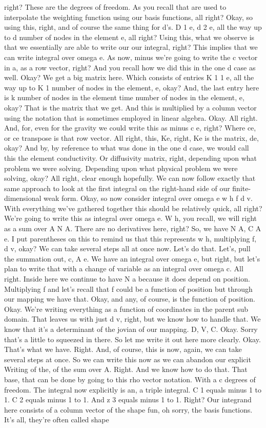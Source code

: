 \documentclass[10pt]{article}
\begin{document}
right? These are the degrees of freedom. As you recall that are used to interpolate the weighting function using our basis functions, all right? Okay, so using this, right, and of course the same thing for d's. D 1 e, d 2 e, all the way up to d number of nodes in the element e, all right? Using this, what we observe is that we essentially are able to write our our integral, right? This implies that we can write integral over omega e. As now, minus we're going to write the c vector in a, as a row vector, right? And you recall how we did this in the one d case as well. Okay? We get a big matrix here. Which consists of entries K 1 1 e, all the way up to K 1 number of nodes in the element, e, okay? And, the last entry here is k number of nodes in the element time number of nodes in the element, e, okay? That is the matrix that we get. And this is multiplied by a column vector using the notation that is sometimes employed in linear algebra. Okay. All right. And, for, even for the gravity we could write this as minus c e, right? Where ce, or ce transpose is that row vector. All right, this, Ke, right, Ke is the matrix, de, okay? And by, by reference to what was done in the one d case, we would call this the element conductivity. Or diffusivity matrix, right, depending upon what problem we were solving. Depending upon what physical problem we were solving, okay? All right, clear enough hopefully. We can now follow exactly that same approach to look at the first integral on the right-hand side of our finite-dimensional weak form. Okay, so now consider integral over omega e w h f d v. With everything we've gathered together this should be relatively quick, all right? We're going to write this as integral over omega e. W h, you recall, we will right as a sum over A N A. There are no derivatives here, right? So, we have N A, C A e. I put parentheses on this to remind us that this represents w h, multiplying f, d v, okay? We can take several steps all at once now. Let's do that. Let's, pull the summation out, c, A e. We have an integral over omega e, but right, but let's plan to write that with a change of variable as an integral over omega c. All right. Inside here we continue to have N a because it does depend on position. Multiplying f and let's recall that f could be a function of position but through our mapping we have that. Okay, and any, of course, is the function of position. Okay. We're writing everything as a function of coordinates in the parent sub domain. That leaves us with just d v, right, but we know how to handle that. We know that it's a determinant of the jovian of our mapping. D, V, C. Okay. Sorry that's a little to squeezed in there. So let me write it out here more clearly. Okay. That's what we have. Right. And, of course, this is now, again, we can take several steps at once. So we can write this now as we can abandon our explicit Writing of the, of the sum over A. Right. And we know how to do that. That base, that can be done by going to this rho vector notation. With a c degrees of freedom. The integral now explicitly is an, a triple integral. C 1 equals minus 1 to 1. C 2 equals minus 1 to 1. And z 3 equals minus 1 to 1. Right? Our integrand here consists of a column vector of the shape fun, oh sorry, the basis functions. It's all, they're often called shape 
\end{document}
